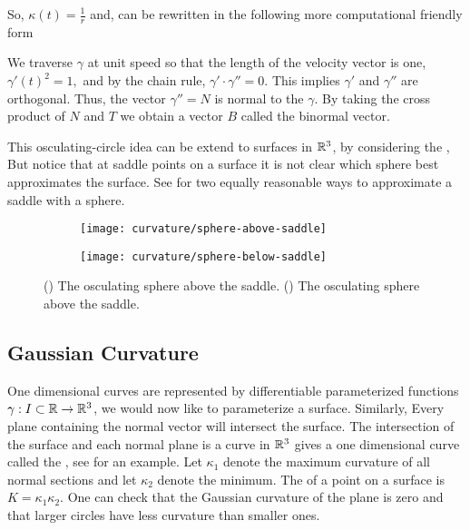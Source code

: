





So, $\kappa(t)=\frac{1}{r}$ and, can be rewritten in the following more computational friendly form 


We traverse $\gamma$
at unit speed so that the length of the velocity vector is one, $\gamma'(t)^2=1,$ and by the chain rule, $\gamma'\cdot \gamma''=0$.
This implies $\gamma'$ and $\gamma''$ are orthogonal.
Thus, the
vector $\gamma''=N$ is normal to the $\gamma$. 
By taking the cross product of $N$ and $T$ we obtain a vector $B$ called
the binormal vector.

 This osculating-circle idea can be extend
to  surfaces in $\mathbb{R}^3$, by considering the ,
But notice that at saddle points on a surface it is not clear which sphere
best approximates the surface. See  for two
equally reasonable ways to approximate a saddle with a sphere.

\begin{figure}[htb]
    \captionsetup[subfigure]{justification=centering}
    \centering
    \begin{subfigure}[b]{0.25\textwidth}
        \texttt{[image: curvature/sphere-above-saddle]}
       \subcaption{}\label{fig:sphere-above-saddle}
    \end{subfigure}
        \hspace{1cm}
        \begin{subfigure}[b]{0.25\textwidth}
        \texttt{[image: curvature/sphere-below-saddle]}
        \subcaption{}\label{fig:sphere-below-saddle}
        \end{subfigure}
    \caption{() The osculating sphere above the saddle.
        () The osculating sphere above the saddle.
    }
    \label{fig:osculating-sphere}
\end{figure}



\subsection{Gaussian Curvature}


One dimensional curves are represented by differentiable 
parameterized functions $\gamma:I\subset \mathbb{R}\to \mathbb{R}^3$,
we would now like to parameterize a surface.
Similarly, 
Every plane containing the normal vector will intersect the surface.
The intersection of the surface and each normal plane is a curve in $\mathbb{R}^3$
gives a one dimensional curve called the , see  
for an example.
Let $\kappa_1$ denote the maximum curvature of all normal sections 
and let $\kappa_2$ denote the minimum. 
The  of a point on a surface is
$K=\kappa_1\kappa_2.$
One can check that the Gaussian curvature of the plane is zero and
that larger circles have less curvature than smaller ones.



